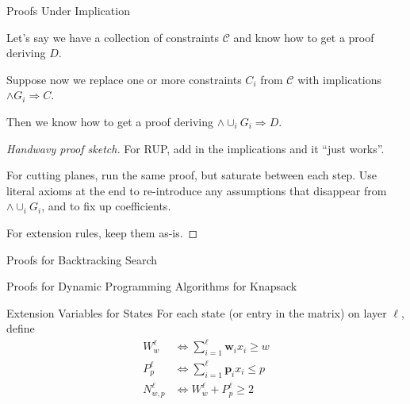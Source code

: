 \documentclass[aspectratio=169,compress,10pt]{beamer}
\begin{document}
\begin{frame}{Proofs Under Implication}
    \begin{theorem}
    Let's say we have a collection of constraints $\mathcal{C}$ and know how to get a proof deriving
        $D$. \\\medskip

    Suppose now we replace one or more constraints $C_i$ from $\mathcal{C}$ with implications $\land
        G_i \Rightarrow C$. \\\medskip

    Then we know how to get a proof deriving $\land \cup_i G_i \Rightarrow D$.
    \end{theorem}
    \begin{proof}[Handwavy proof sketch]
        For RUP, add in the implications and it ``just works''. \\\medskip

        For cutting planes, run the same proof, but saturate between each step. Use literal
        axioms at the end to re-introduce any assumptions that disappear from $\land \cup_i G_i$,
        and to fix up coefficients. \\\medskip

        For extension rules, keep them as-is.
    \end{proof}
\end{frame}

\begin{frame}{Proofs for Backtracking Search}
\end{frame}

\begin{frame}{Proofs for Dynamic Programming Algorithms for Knapsack}
\end{frame}

\begin{frame}{Extension Variables for States}
    For each state (or entry in the matrix) on layer $\ell$, define
    \begin{align*}
        W^{\ell}_{w} &\Leftrightarrow \sum_{i=1}^{\ell} \boldsymbol{w}_i x_i \ge w \\
        P^{\ell}_{p} &\Leftrightarrow \sum_{i=1}^{\ell} \boldsymbol{p}_i x_i \le p \\
        N^{\ell}_{w,p} & \Leftrightarrow W^{\ell}_{w} + P^{\ell}_{p} \ge 2
    \end{align*}
\end{frame}
\end{document}
